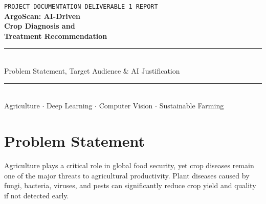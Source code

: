 \documentclass[12pt,a4paper]{article}
\begin{document}

\begin{titlepage}
  \pagecolor{primarynavy}
  \color{white}
  \vspace*{1.5cm}
  \begin{center}
    {\fontsize{11}{13}\selectfont\texttt{PROJECT DOCUMENTATION \quad \textbullet \quad DELIVERABLE 1 REPORT}}\\[0.8cm]
    {\fontsize{32}{38}\selectfont\bfseries ArgoScan: AI-Driven}\\[0.2cm]
    {\fontsize{32}{38}\selectfont\bfseries Crop Diagnosis and}\\[0.2cm]
    {\fontsize{32}{38}\selectfont\bfseries Treatment Recommendation}\\[1cm]
    {\color{iceblue}\rule{10cm}{1pt}}\\[0.7cm]
    {\large Problem Statement, Target Audience \& AI Justification}\\[2.5cm]

  \end{center}
  \vfill
  \begin{center}
    {\color{iceblue}\rule{10cm}{0.5pt}}\\[0.4cm]
    {\small Agriculture $\cdot$ Deep Learning $\cdot$ Computer Vision $\cdot$ Sustainable Farming}
  \end{center}
\end{titlepage}

\nopagecolor
\newpage

\section{Problem Statement}

Agriculture plays a critical role in global food security, yet crop diseases remain one of the major threats to agricultural productivity. Plant diseases caused by fungi, bacteria, viruses, and pests can significantly reduce crop yield and quality if not detected early.
\end{document}
